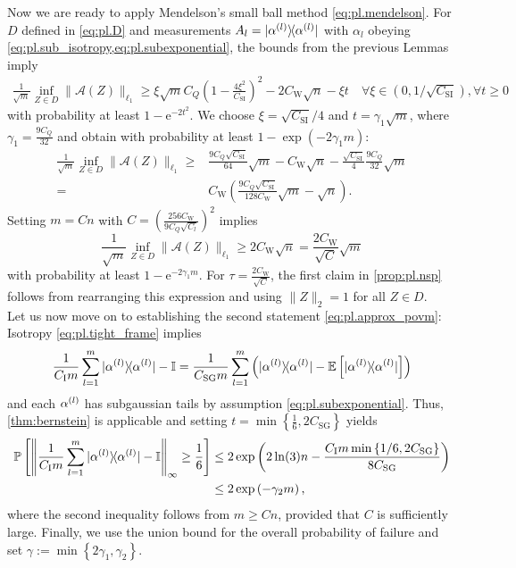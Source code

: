 Now we are ready to apply Mendelson's small ball method \eqref{eq:pl.mendelson}.
For $D$ defined in \eqref{eq:pl.D} and measurements $ A_l = \ketbra{\alpha\ind{l}}$ with $\alpha_l$ obeying \cref{eq:pl.sub_isotropy,eq:pl.subexponential}, the bounds from the previous Lemmas imply
\begin{align}
  \frac{1}{\sqrt{m}}\inf_{ Z \in D} \|\mathcal{A}( Z) \|_{\ell_1} \geq \xi \sqrt{m} C_Q \left( 1- \frac{4 \xi^2}{C_\mathrm{SI}} \right)^2 - 2 C_\mathrm{W} \sqrt{n} - \xi t \quad \forall \xi \in (0, 1/\sqrt{C_\mathrm{SI}}), \forall t \geq 0
\end{align}
with probability at least $1- \mathrm{e}^{-2t^2}$. We choose $\xi = \sqrt{C_\mathrm{SI}}/4$ and $t = \gamma_1 \sqrt{m}$, where $\gamma_1 = \frac{9 C_Q}{32}$ and obtain with probability at least $1-\exp \left( -2 \gamma_1 m \right)$:
\begin{align}
  \frac{1}{\sqrt{m}}\inf_{ Z \in D} \|\mathcal{A}( Z) \|_{\ell_1} \geq & \frac{9 C_Q\sqrt{C_\mathrm{SI}}}{64} \sqrt{m} -  C_\mathrm{W}\sqrt{n} - \frac{\sqrt{C_\mathrm{SI}}}{4} \frac{9 C_Q}{32} \sqrt{m} \\
  = & C_\mathrm{W} \left( \frac{9 C_Q \sqrt{C_\mathrm{SI}}}{128 C_\mathrm{W}} \sqrt{m} - \sqrt{n} \right).
\end{align}
Setting $m = C n$ with $C = \left( \frac{256 C_\mathrm{W}}{9 C_Q \sqrt{C_l}} \right)^2$ implies
\[
  \frac{1}{\sqrt{m}} \inf_{ Z \in D} \| \mathcal{A}( Z) \|_{\ell_1} \geq 2 C_\mathrm{W} \sqrt{n} = \frac{2 C_\mathrm{W}}{\sqrt{C}} \sqrt{m}
\]
with probability at least $1- \mathrm{e}^{-2 \gamma_1 m}$.
For $\tau = \frac{ 2 C_\mathrm{W}}{\sqrt{C}}$, the first claim in \cref{prop:pl.nsp} follows from rearranging this expression and using $\|  Z \|_2=1$ for all $ Z \in D$.\\


Let us now move on to establishing the second statement \eqref{eq:pl.approx_povm}:
Isotropy \eqref{eq:pl.tight_frame} implies
\begin{align}
  \frac{1}{ C_\mathrm{I} m} \sum_{l=1}^m \ketbra{\alpha\ind{l}} - \mathbb{I}
  = \frac{1}{C_\mathrm{SG} m} \sum_{l=1}^m \left( \ketbra{\alpha\ind{l}} - \mathbb{E} \left[ \ketbra{\alpha\ind{l}} \right] \right)
\end{align}
and each $\alpha^{(l)}$ has subgaussian tails by assumption \eqref{eq:pl.subexponential}.
Thus, \cref{thm:bernstein} is applicable and setting $t= \min \left\{\frac{1}{6},2 C_\mathrm{SG} \right\}$ yields
\begin{align}
  \Prob \left[ \left\| \frac{1}{C_\mathrm{I} m} \sum_{l=1}^m \ketbra{\alpha\ind{l}} -  \mathbb{I} \right\|_\infty \geq \frac{1}{6} \right]
  & \leq 2 \exp \left( 2 \ln (3) n - \frac{C_\mathrm{I} m \min\left\{ 1/6, 2 C_\mathrm{SG} \right\}}{8 C_\mathrm{SG}} \right) \\
  & \leq 2 \exp \left( - \gamma_2 m \right),
\end{align}
where the second inequality follows from $m \geq C n$, provided that $C$ is sufficiently large. Finally, we use the union bound  for the overall probability of failure and set $\gamma := \min \left\{ 2 \gamma_1,\gamma_2 \right\}$.



